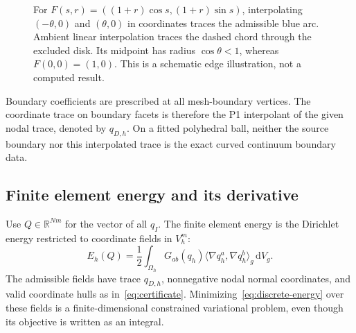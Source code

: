 \documentclass[11pt,a4paper]{article}
\newcommand{\R}{\mathbb R}
\newcommand{\dd}{\,\mathrm d}
\newcommand{\ip}[2]{\langle #1,#2\rangle_g}
\begin{document}
\begin{figure}[htbp]
\centering
{}
\caption{For \(F(s,r)=((1+r)\cos s,(1+r)\sin s)\), interpolating
\((-\theta,0)\) and \((\theta,0)\) in coordinates traces the admissible
blue arc. Ambient linear interpolation traces the dashed chord through the
excluded disk. Its midpoint has radius \(\cos\theta<1\), whereas
\(F(0,0)=(1,0)\). This is a schematic edge illustration, not a computed result.}
\label{fig:interpolation}
\end{figure}

Boundary coefficients are prescribed at all mesh-boundary vertices. The
coordinate trace on boundary facets is therefore the P1 interpolant of the
given nodal trace, denoted by \(q_{D,h}\). On a fitted polyhedral ball, neither the source boundary
nor this interpolated trace is the exact curved continuum boundary data.

\subsection{Finite element energy and its derivative}
Use \(Q\in\R^{Nm}\) for the vector of all \(q_I\). The finite element
energy is the Dirichlet energy restricted to coordinate fields in \(V_h^m\):
\begin{equation}
 E_h(Q)=\frac12\int_{\Omega_h}
 G_{ab}(q_h)\ip{\nabla q_h^a}{\nabla q_h^b}\dd V_g.
 \label{eq:discrete-energy}
\end{equation}
The admissible fields have trace \(q_{D,h}\), nonnegative nodal normal
coordinates, and valid coordinate hulls as in~\eqref{eq:certificate}.
Minimizing~\eqref{eq:discrete-energy} over these fields is a
finite-dimensional constrained variational problem, even though its
objective is written as an integral.
\end{document}
